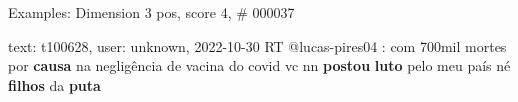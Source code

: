 \begin{frame}{Examples: Dimension 3 pos, score 4, \# 000037}
\footnotesize
\begin{exampleblock}{text: t100628, user: unknown, 2022-10-30}
RT @lucas-pires04 : com 700mil mortes por \textbf{causa} na negligência de 
vacina do covid vc nn \textbf{postou} \textbf{luto} pelo meu país né 
\textbf{filhos} da \textbf{puta} 
\end{exampleblock}
\end{frame}
